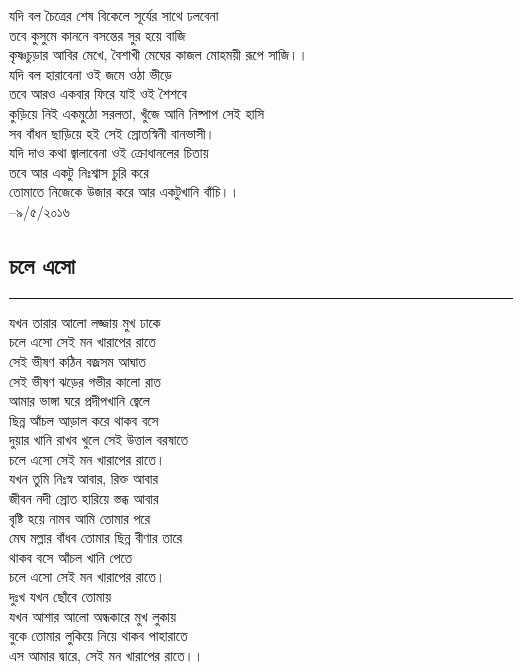 \documentclass[12pt]{article}
\begin{document}
\noindent
যদি বল চৈত্রের শেষ বিকেলে সূর্যের সাথে ঢলবেনা\\
তবে কুসুমে কাননে বসন্তের সুর হয়ে বাজি\\
কৃষ্ণচুড়ার আবির মেখে, বৈশাখী মেঘের কাজল মোহময়ী রূপে সাজি।।\\

\noindent
যদি বল হারাবেনা ওই জমে ওঠা ভীড়ে\\
তবে আরও একবার ফিরে যাই ওই শৈশবে\\
কুড়িয়ে নিই একমুঠো সরলতা, খুঁজে আনি নিষ্পাপ সেই হাসি\\
সব বাঁধন ছাড়িয়ে হই সেই স্রোতস্বিনী বানভাসী।\\

\noindent
যদি দাও কথা জ্বালাবেনা ওই ক্রোধানলের চিতায়\\
তবে আর একটু নিঃশ্বাস চুরি করে\\
তোমাতে নিজেকে উজার করে আর একটুখানি বাঁচি।।\\

--৯/৫/২০১৬
\newpage

\subsection*{চলে এসো }
\hrule
\vspace{1in}
যখন তারার আলো লজ্জায় মুখ ঢাকে\\
চলে এসো সেই মন খারাপের রাতে\\
সেই ভীষণ কঠিন বজ্রসম আঘাত\\
সেই ভীষণ ঝড়ের গভীর কালো রাত\\
আমার ভাঙ্গা ঘরে প্রদীপখানি জ্বেলে\\
ছিন্ন আঁচল আড়াল করে থাকব বসে\\
দুয়ার খানি রাখব খুলে সেই উত্তাল বরষাতে\\
চলে এসো সেই মন খারাপের রাতে।\\

\noindent
যখন তুমি নিঃস্ব আবার, রিক্ত আবার\\
জীবন নদী স্রোত হারিয়ে স্তব্ধ আবার\\
বৃষ্টি হয়ে নামব আমি তোমার পরে\\
মেঘ মল্লার বাঁধব তোমার ছিন্ন বীণার তারে\\
থাকব বসে আঁচল খানি পেতে\\
চলে এসো সেই মন খারাপের রাতে।\\

\noindent
দুঃখ যখন ছোঁবে তোমায়\\
যখন আশার আলো অন্ধকারে মুখ লুকায়\\
বুকে তোমার লুকিয়ে নিয়ে থাকব পাহারাতে\\
এস আমার দ্বারে, সেই মন খারাপের রাতে।।\\
\newpage
\end{document}
